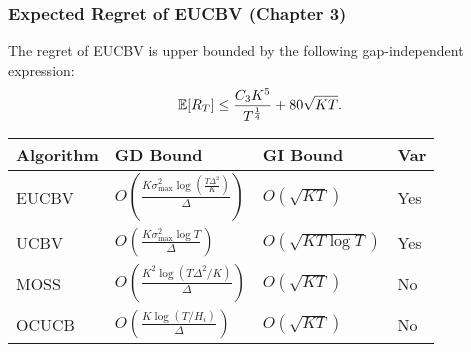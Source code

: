\begin{frame}
\frametitle{Expected Regret of EUCBV ({Chapter 3})}
%
%
%

\begin{corollary}
\label{Result:Corollary:1}
The regret of EUCBV is upper bounded by the following gap-independent expression:
\begin{align*}
	\mathbb{E}[R_{T}]\leq  \frac{C_3 K^5}{T^{\frac{1}{4}}} + 80\sqrt{KT}.
\end{align*}	
\end{corollary}


\begin{table}[b]
\label{tab:comp-bds}
\begin{center}
\begin{tabular}{|p{1.5cm}|p{3.1cm}|p{3.1cm}|p{1.0cm}|}
\hline
Algorithm  & GD Bound & GI Bound & Var \\
\hline
EUCBV      &$O\left( \frac{K\sigma_{\max}^{2}\log (\frac{T\Delta^2}{K})}{\Delta}\right)$ & $O\left(\sqrt{KT}\right)$ & Yes\\
\hline
UCBV		&$O\left( \frac{K\sigma_{\max}^{2}\log T}{\Delta} \right)$ & $O\left(\sqrt{KT\log T}\right)$ & Yes\\
\hline
MOSS         &$O\left( \frac{K^2\log (T\Delta^2 /K)}{\Delta}\right)$ & $O\left(\sqrt{KT}\right)$ & No\\
\hline
OCUCB		&$O\left( \frac{K\log (T/ H_{i})}{\Delta}\right)$ &  $O\left(\sqrt{KT}\right)$ & No\\
\hline

\end{tabular}
\end{center}
\end{table}



\end{frame}

